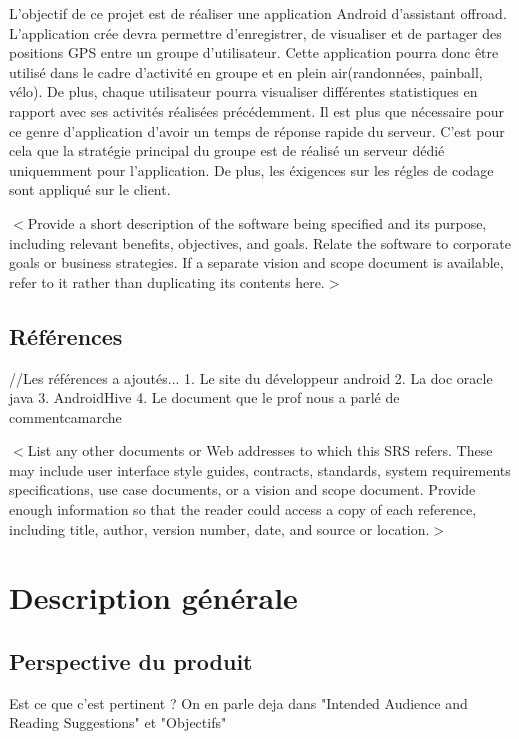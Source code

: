 \documentclass[titlepage]{report}
\begin{document}
L'objectif de ce projet est de réaliser une application Android d'assistant offroad.
L'application crée devra permettre d'enregistrer, de visualiser et de partager des positions GPS entre un groupe d'utilisateur. Cette application pourra donc être utilisé dans le cadre d'activité en groupe et en plein air(randonnées, painball, vélo). 
De plus, chaque utilisateur pourra visualiser différentes statistiques en rapport avec ses activités réalisées précédemment.
Il est plus que nécessaire pour ce genre d'application d'avoir un temps de réponse rapide du serveur. C'est pour cela que la stratégie
principal du groupe est de réalisé un serveur dédié uniquemment pour l'application.
De plus, les éxigences sur les régles de codage sont appliqué sur le client.

$<$Provide a short description of the software being specified and its purpose, 
including relevant benefits, objectives, and goals. Relate the software to 
corporate goals or business strategies. If a separate vision and scope document 
is available, refer to it rather than duplicating its contents here.$>$

\section{Références}

//Les références a ajoutés...
1. Le site du développeur android
2. La doc oracle java
3. AndroidHive
4. Le document que le prof nous a parlé de commentcamarche

$<$List any other documents or Web addresses to which this SRS refers. These may 
include user interface style guides, contracts, standards, system requirements 
specifications, use case documents, or a vision and scope document. Provide 
enough information so that the reader could access a copy of each reference, 
including title, author, version number, date, and source or location.$>$


\chapter{Description générale}

\section{Perspective du produit}

Est ce que c'est pertinent ? On en parle deja dans "Intended Audience and Reading Suggestions" et "Objectifs"
\end{document}
